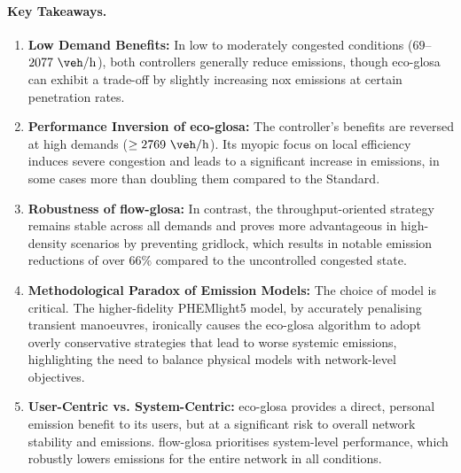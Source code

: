 \paragraph{Key Takeaways.}
\begin{enumerate}
    \item \textbf{Low Demand Benefits:} In low to moderately congested conditions ($69$--$2077~\unit{\veh\per\hour}$), both controllers generally reduce emissions, though \ac{eco-glosa} can exhibit a trade-off by slightly increasing \ac{nox} emissions at certain penetration rates.
    \item \textbf{Performance Inversion of \ac{eco-glosa}:} The controller's benefits are reversed at high demands ($ \geq 2769~\unit{\veh\per\hour}$). Its myopic focus on local efficiency induces severe congestion and leads to a significant increase in emissions, in some cases more than doubling them compared to the Standard.
    \item \textbf{Robustness of \ac{flow-glosa}:} In contrast, the throughput-oriented strategy remains stable across all demands and proves more advantageous in high-density scenarios by preventing gridlock, which results in notable emission reductions of over $66\%$ compared to the uncontrolled congested state.
    \item \textbf{Methodological Paradox of Emission Models:} The choice of model is critical. The higher-fidelity PHEMlight5 model, by accurately penalising transient manoeuvres, ironically causes the \ac{eco-glosa} algorithm to adopt overly conservative strategies that lead to worse systemic emissions, highlighting the need to balance physical models with network-level objectives.
    \item \textbf{User-Centric vs. System-Centric:} \ac{eco-glosa} provides a direct, personal emission benefit to its users, but at a significant risk to overall network stability and emissions. \ac{flow-glosa} prioritises system-level performance, which robustly lowers emissions for the entire network in all conditions.
\end{enumerate}

